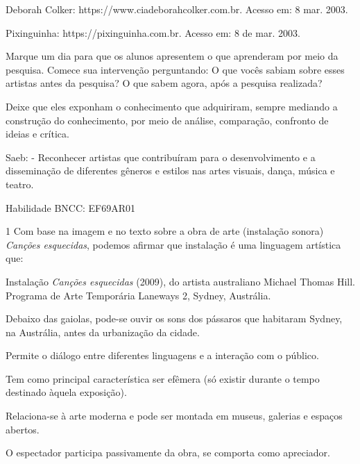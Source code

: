 \begin{escolha}
{Deborah Colker: https://www.ciadeborahcolker.com.br. Acesso em: 8 mar. 2003.

Pixinguinha: https://pixinguinha.com.br. Acesso em: 8 de mar. 2003.

Marque um dia para que os alunos apresentem o que aprenderam por meio da
pesquisa. Comece sua intervenção perguntando: O que vocês sabiam sobre
esses artistas antes da pesquisa? O que sabem agora, após a pesquisa
realizada?

Deixe que eles exponham o conhecimento que adquiriram, sempre mediando a
construção do conhecimento, por meio de análise, comparação, confronto
de ideias e crítica.

Saeb: - Reconhecer artistas que contribuíram para o desenvolvimento e a
disseminação de diferentes gêneros e estilos nas artes visuais, dança,
música e teatro.

Habilidade BNCC: EF69AR01}


\num{1} Com base na imagem e no texto sobre a obra de arte (instalação sonora)
  \emph{Canções esquecidas}, podemos afirmar que instalação é uma
  linguagem artística que:


Instalação \emph{Canções esquecidas} (2009), do artista australiano
Michael Thomas Hill. Programa de Arte Temporária Laneways 2, Sydney,
Austrália.

Debaixo das gaiolas, pode-se ouvir os sons dos pássaros que habitaram
Sydney, na Austrália, antes da urbanização da cidade.

\begin{escolha}
\item
  Permite o diálogo entre diferentes linguagens e a interação com o
  público.
\item
  Tem como principal característica ser efêmera (só existir durante o
  tempo destinado àquela exposição).
\item
  Relaciona-se à arte moderna e pode ser montada em museus, galerias e
  espaços abertos.
\item
  O espectador participa passivamente da obra, se comporta como
  apreciador.
\end{escolha}

\end{escolha}
